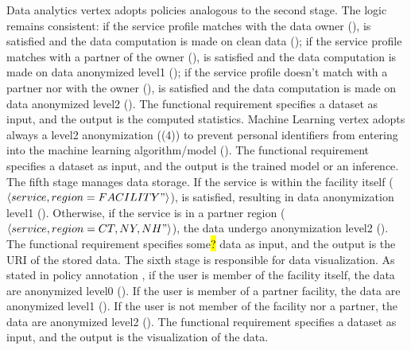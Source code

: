 Data analytics vertex adopts policies analogous to the second stage. The logic remains consistent:
if the service profile matches with the data owner (\pone),  is satisfied and the data computation is made on clean data ();
if the service profile matches with a partner of the owner (\ptwo),  is satisfied and the data computation is made on data anonymized level1 ();
if the service profile doesn't match with a partner nor with the owner (\pthree),  is satisfied and the data computation is made on data anonymized level2  ().
The functional requirement specifies a dataset as input, and the output is the computed statistics.
Machine Learning vertex adopts always a level2 anonymization (\p(4)) to prevent personal identifiers from entering into the machine learning algorithm/model ().
The functional requirement specifies a dataset as input, and the output is the trained model or an inference.
The fifth stage manages data storage.
If the service is within the facility itself ($\langle service,region=FACILITY"\rangle$),  is satisfied, resulting in data anonymization level1 ().
Otherwise, if the service is in a partner region ($\langle service,region={CT,NY,NH}"\rangle$), the data undergo anonymization level2 ().
The functional requirement specifies some\hl{?} data as input, and the output is the URI of the stored data.
The sixth stage is responsible for data visualization.
As stated in policy annotation , if the user is member of the facility itself, the data are anonymized level0 ().
If the user is member of a partner facility, the data are anonymized level1 ().
If the user is not member of the facility nor a partner, the data are anonymized level2 ().
The functional requirement specifies a dataset as input, and the output is the visualization of the data.





